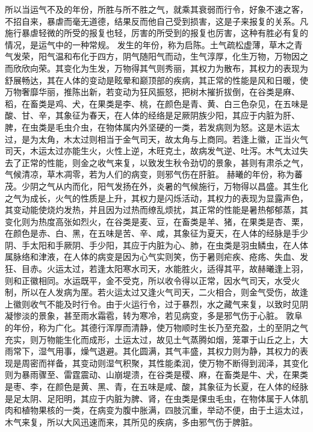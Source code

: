 \documentclass[a4paper,12pt,UTF8,twoside]{ctexbook}
\begin{document}
所以当运气不及的年份，所胜与所不胜之气，就乘其衰弱而行令，好象不速之客，不招自来，暴虐而毫无道德，结果反而他自己受到损害，这是子来报复的关系。凡施行暴虐轻微的所受的报复也轻，厉害的所受到的报复也厉害，这种有胜必有复的情况，是运气中的一种常规。
发生的年份，称为启陈。土气疏松虚薄，草木之青气发荣，阳气温和布化于四方，阴气随阳气而动，生气淳厚，化生万物，万物因之而欣欣向荣。其变化为生发，万物得其气则秀丽，其权力为散布，其权力的表现为舒展畅达，其在人体的变动是眩晕和巅顶部的疾病，其正常的性能是风和日暖，使万物奢靡华丽，推陈出新，若变动为狂风振怒，把树木摧折拔倒，在谷类是麻、稻，在畜类是鸡、犬，在果类是李、桃，在颜色是青、黄、白三色杂见，在五味是酸、甘、辛，其象征为春天，在人体的经络是足厥阴族少阳，其应于内脏为肝、脾，在虫类是毛虫介虫，在物体属内外坚硬的一类，若发病则为怒。这是木运太过，是为太角，木太过则相当于金气司天，故太角与上商同。若逢上徽，正当火气司天，木运太过亦能生火，火性上逆，木旺克土，故病发气逆、吐泻。木气太过失去了正常的性能，则金之收气来复，以致发生秋令劲切的景象，甚则有肃杀之气，气候清凉，草木凋零，若为人们的病变，则邪气伤在肝脏。
赫曦的年份，称为蕃茂。少阴之气从内而化，阳气发扬在外，炎暑的气候施行，万物得以昌盛。其生化之气为成长，火气的性质是上升，其权力是闪烁活动，其权力的表现为显露声色，其变动能使烧灼发热，并且因为过热而缭乱烦扰，其正常的性能是暑热郁郁蒸，其变化则为热度高张如烈火，在谷类是麦、豆，在畜类是羊、猪，在果类是杏、栗，在颜色是赤、白、黑，在五味是苦、辛、咸，其象征为夏天，在人体的经脉是手少阴、手太阳和手厥阴、手少阳，其应于内脏为心、肺，在虫类是羽虫鳞虫，在人体属脉络和津液，在人体的病变是因为心气实则笑，伤于暑则疟疾、疮疡、失血、发狂、目赤。火运太过，若逢太阳寒水司天，水能胜火，适得其平，故赫曦逢上羽，则和正徽相同。水运既平，金不受克，所以收令得以正常，因水气司天，水受火制，所以在人发病为厔。若火运太过又逢火气司天，二火相合，则金气受伤，故逢上徽则收气不能及时行令。由于火运行令，过于暴烈，水之藏气来复，以致时见阴凝惨淡的景象，甚至雨水霜雹，转为寒冷，若见病变，多是邪气伤于心脏。
敦阜的年份，称为广化。其德行浑厚而清静，使万物顺时生长乃至充盈，土的至阴之气充实，则万物能生化而成形，土运太过，故见土气蒸腾如烟，笼罩于山丘之上，大雨常下，湿气用事，燥气退避。其化圆满，其气丰盛，其权力则为静，其权力的表现是周密而祥备，其变动则湿气积聚，其性能柔润，使万物不断得到润泽，其变化则为暴雨骤至、雷霆震动、山崩堤溃，在谷类是稷、麻，在畜类是牛、犬，在果类是枣、李，在颜色是黄、黑、青，在五味是咸、酸，其象征为长夏，在人体的经脉是足太阴、足阳明，其应于内脏为脾、肾，在虫类是倮虫毛虫，在物体属于人体肌肉和植物果核的一类，在病变为腹中胀满，四肢沉重，举动不便，由于土运太过，木气来复，所以大风迅速而来，其所见的疾病，多由邪气伤于脾脏。
\end{document}

